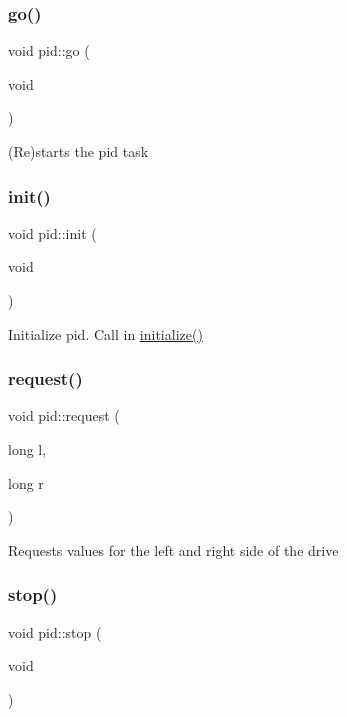 \subsubsection{\texorpdfstring{go()}{go()}}
{\footnotesize\ttfamily void pid\+::go (\begin{DoxyParamCaption}\item[{void}]{ }\end{DoxyParamCaption})}

(Re)starts the pid task \mbox{\label{namespacepid_aa59662d2f69d5a905a28f2ca9bc6bdcb}} 
\subsubsection{\texorpdfstring{init()}{init()}}
{\footnotesize\ttfamily void pid\+::init (\begin{DoxyParamCaption}\item[{void}]{ }\end{DoxyParamCaption})}

Initialize pid. Call in \hyperlink{main_8h_a25a40b6614565f755233080a384c35f1}{initialize()} \mbox{\label{namespacepid_a8a2a0422275eb1a3310411a7eccda378}} 
\subsubsection{\texorpdfstring{request()}{request()}}
{\footnotesize\ttfamily void pid\+::request (\begin{DoxyParamCaption}\item[{long}]{l,  }\item[{long}]{r }\end{DoxyParamCaption})}

Requests values for the left and right side of the drive \mbox{\label{namespacepid_a702bbb1d722eedebf32c55c89ff8afd6}} 
\subsubsection{\texorpdfstring{stop()}{stop()}}
{\footnotesize\ttfamily void pid\+::stop (\begin{DoxyParamCaption}\item[{void}]{ }\end{DoxyParamCaption})}

